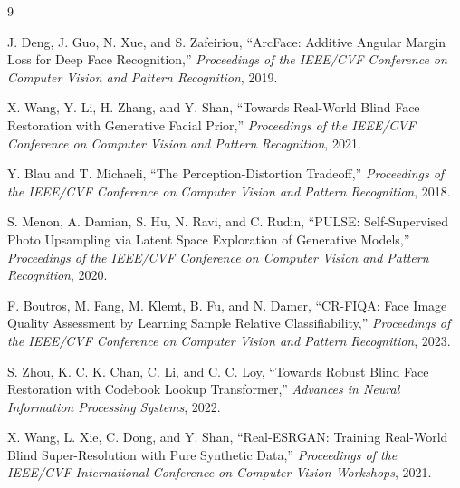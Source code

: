 \documentclass[UTF8,a4paper,10pt]{ctexart}
\begin{document}
\small
\begin{thebibliography}{9}
\setlength{\itemsep}{0.15em}

J. Deng, J. Guo, N. Xue, and S. Zafeiriou,
``ArcFace: Additive Angular Margin Loss for Deep Face Recognition,''
\textit{Proceedings of the IEEE/CVF Conference on Computer Vision and Pattern Recognition},
2019.

X. Wang, Y. Li, H. Zhang, and Y. Shan,
``Towards Real-World Blind Face Restoration with Generative Facial Prior,''
\textit{Proceedings of the IEEE/CVF Conference on Computer Vision and Pattern Recognition},
2021.

Y. Blau and T. Michaeli,
``The Perception-Distortion Tradeoff,''
\textit{Proceedings of the IEEE/CVF Conference on Computer Vision and Pattern Recognition},
2018.

S. Menon, A. Damian, S. Hu, N. Ravi, and C. Rudin,
``PULSE: Self-Supervised Photo Upsampling via Latent Space Exploration of Generative Models,''
\textit{Proceedings of the IEEE/CVF Conference on Computer Vision and Pattern Recognition},
2020.

F. Boutros, M. Fang, M. Klemt, B. Fu, and N. Damer,
``CR-FIQA: Face Image Quality Assessment by Learning Sample Relative Classifiability,''
\textit{Proceedings of the IEEE/CVF Conference on Computer Vision and Pattern Recognition},
2023.

S. Zhou, K. C. K. Chan, C. Li, and C. C. Loy,
``Towards Robust Blind Face Restoration with Codebook Lookup Transformer,''
\textit{Advances in Neural Information Processing Systems},
2022.

X. Wang, L. Xie, C. Dong, and Y. Shan,
``Real-ESRGAN: Training Real-World Blind Super-Resolution with Pure Synthetic Data,''
\textit{Proceedings of the IEEE/CVF International Conference on Computer Vision Workshops},
2021.

\end{thebibliography}
\normalsize
\end{document}
